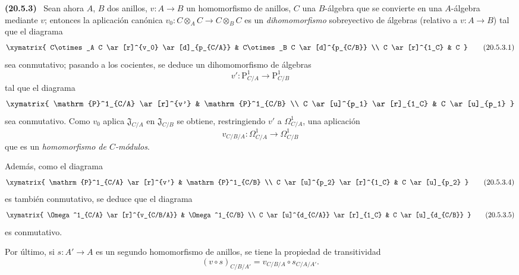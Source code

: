 \documentclass[10pt,oneside]{book}
\makeatletter
\newcommand{\setmanualcurrentlabel}[1]{\def\@currentlabel{#1}}
\newcommand{\oldpage}[2][]{%
  \setcounter{footnote}{0}%
  \marginpar{\scriptsize\textbf{#1}~|~#2}\ignorespaces}
\newenvironment{env}[1][]{\setmanualcurrentlabel{#1}\par\medskip\noindent\textbf{(#1)}\ }{\par}
\makeatother
\begin{document}
\begin{env}[20.5.3]
\label{0.20.5.3-es}
Sean ahora $A$, $B$ dos anillos, $v:A\to B$ un homomorfismo
de anillos, $C$ una $B$-álgebra que se convierte en una $A$-álgebra mediante $v$;
entonces la aplicación canónica $v_0:C\otimes_A C\to C\otimes_B C$ es un
\emph{dihomomorfismo} sobreyectivo de álgebras (relativo a $v:A\to B$) tal que
el diagrama
\[
\xymatrix{
  C\otimes_A C \ar[r]^{v_0} \ar[d]_{p_{C/A}} &
  C\otimes_B C \ar[d]^{p_{C/B}} \\
  C \ar[r]^{1_C} & C
}
\tag{20.5.3.1}
\label{0.20.5.3.1-es}
\]
sea conmutativo; pasando a los cocientes, se deduce un
dihomomorfismo de álgebras
\begin{equation}
\tag{20.5.3.2}
\label{0.20.5.3.2-es}
  v':\mathrm{P}^1_{C/A}\to\mathrm{P}^1_{C/B}
\end{equation}
tal que el diagrama
\[
\xymatrix{
  \mathrm{P}^1_{C/A} \ar[r]^{v'} & \mathrm{P}^1_{C/B} \\
  C \ar[u]^{p_1} \ar[r]_{1_C} & C \ar[u]_{p_1}
}
\]
sea conmutativo. Como $v_0$ aplica $\mathfrak{J}_{C/A}$ en
$\mathfrak{J}_{C/B}$ se obtiene, restringiendo $v'$ a
$\Omega^1_{C/A}$, una aplicación
\begin{equation}
\tag{20.5.3.3}
\label{0.20.5.3.3-es}
  v_{C/B/A}:\Omega^1_{C/A}\to\Omega^1_{C/B}
\end{equation}
que es un \emph{homomorfismo de $C$-módulos}.

\oldpage[0\textsubscript{IV-1}]{130}
Además, como el diagrama
\[
\xymatrix{
  \mathrm{P}^1_{C/A} \ar[r]^{v'} & \mathrm{P}^1_{C/B} \\
  C \ar[u]^{p_2} \ar[r]^{1_C} & C \ar[u]_{p_2}
}
\tag{20.5.3.4}
\label{0.20.5.3.4-es}
\]
es también conmutativo, se deduce que el diagrama
\[
\xymatrix{
  \Omega^1_{C/A} \ar[r]^{v_{C/B/A}} & \Omega^1_{C/B} \\
  C \ar[u]^{d_{C/A}} \ar[r]_{1_C} & C \ar[u]_{d_{C/B}}
}
\tag{20.5.3.5}
\label{0.20.5.3.5-es}
\]
es conmutativo.

Por último, si $s:A'\to A$ es un segundo homomorfismo de anillos, se tiene la
propiedad de transitividad
\begin{equation}
\tag{20.5.3.6}
\label{0.20.5.3.6-es}
  (v\circ s)_{C/B/A'}=v_{C/B/A}\circ s_{C/A/A'}.
\end{equation}
\end{env}
\end{document}
